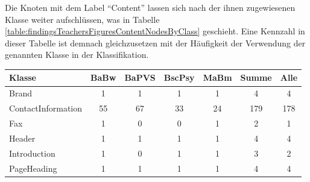     Die Knoten mit dem Label "`Content"' lassen sich nach der ihnen zugewiesenen Klasse
    weiter aufschlüssen, was in Tabelle \ref{table:findingsTeachersFiguresContentNodesByClass} geschieht.
    Eine Kennzahl in dieser Tabelle ist demnach gleichzusetzen mit der Häufigkeit der Verwendung
    der genannten Klasse in der Klassifikation.

    \begin{table}[htb]
        \centering
        \begin{tabular}{|l|c|c|c|c|c|c|}
        \hline
            \textbf{Klasse}  & \multicolumn{1}{l|}{\textbf{BaBw}} & \multicolumn{1}{l|}{\textbf{BaPVS}} & \multicolumn{1}{l|}{\textbf{BscPsy}} & \multicolumn{1}{l|}{\textbf{MaBm}} & \multicolumn{1}{l|}{\textbf{Summe}} & \multicolumn{1}{l|}{\textbf{Alle}} \\ \hline
            Brand              & 1                                  & 1                                   & 1                                    & 1                                  & 4                                   & 4                                  \\ \hline
            ContactInformation & 55                                 & 67                                  & 33                                   & 24                                 & 179                                 & 178                                \\ \hline
            Fax                & 1                                  & 0                                   & 0                                    & 1                                  & 2                                   & 1                                  \\ \hline
            Header             & 1                                  & 1                                   & 1                                    & 1                                  & 4                                   & 4                                  \\ \hline
            Introduction       & 1                                  & 0                                   & 1                                    & 1                                  & 3                                   & 2                                  \\ \hline
            PageHeading        & 1                                  & 1                                   & 1                                    & 1                                  & 4                                   & 4                                  \\ \hline

\end{tabular}
\end{table}
